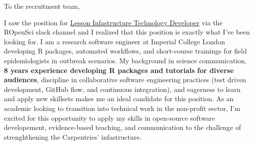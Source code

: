 




\vspace{1ex}
To the recruitment team,

\vspace{1ex}


I saw the position for
\href{https://static.carpentries.org/lesson-infrastructure-technology-developer/}{Lesson
Infastructure Technology Developer} via the ROpenSci slack channel and I
realized that this position is exactly what I've been looking for. I am a
research software engineer at Imperial College London
developing R packages, automated workflows, and short-course trainings for
field epidemiologists in outbreak scenarios. 
My background in science communication, \textbf{8 years experience developing R
packages and tutorials for diverse audiences}, discipline in collaborative
software engineering practices (test driven development, GitHub flow, and
continuous integration), and eagerness to learn and apply new skillsets makes
me an ideal candidate for this position. As an academic looking to transition into
technical work in the non-profit sector, I'm excited for this opportunity to
apply my skills in open-source software developement, evidence-based teaching,
and communication to the challenge of strenghthening the Carpentries'
infastructure. 

